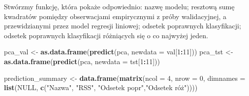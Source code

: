 \documentclass[
]{article}
\newenvironment{Shaded}{\begin{snugshade}}{\end{snugshade}}
\newcommand{\AttributeTok}[1]{\textcolor[rgb]{0.13,0.29,0.53}{#1}}
\newcommand{\ConstantTok}[1]{\textcolor[rgb]{0.56,0.35,0.01}{#1}}
\newcommand{\DecValTok}[1]{\textcolor[rgb]{0.00,0.00,0.81}{#1}}
\newcommand{\FunctionTok}[1]{\textcolor[rgb]{0.13,0.29,0.53}{\textbf{#1}}}
\newcommand{\NormalTok}[1]{#1}
\newcommand{\OtherTok}[1]{\textcolor[rgb]{0.56,0.35,0.01}{#1}}
\newcommand{\SpecialCharTok}[1]{\textcolor[rgb]{0.81,0.36,0.00}{\textbf{#1}}}
\newcommand{\StringTok}[1]{\textcolor[rgb]{0.31,0.60,0.02}{#1}}
\begin{document}
Stwórzmy funkcję, która pokaże odpowiednio: nazwę modelu; resztową sumę
kwadratów pomiędzy obserwacjami empirycznymi z próby walidacyjnej, a
przewidzianymi przez model regresji liniowej; odsetek poprawnych
klasyfikacji; odsetek poprawnych klasyfikacji różniących się o co
najwyżej jeden.

\begin{Shaded}
\begin{Highlighting}[]
\NormalTok{pca\_val }\OtherTok{\textless{}{-}} \FunctionTok{as.data.frame}\NormalTok{(}\FunctionTok{predict}\NormalTok{(pca, }\AttributeTok{newdata =}\NormalTok{ val[}\DecValTok{1}\SpecialCharTok{:}\DecValTok{11}\NormalTok{]))}
\NormalTok{pca\_tst }\OtherTok{\textless{}{-}} \FunctionTok{as.data.frame}\NormalTok{(}\FunctionTok{predict}\NormalTok{(pca, }\AttributeTok{newdata =}\NormalTok{ tst[}\DecValTok{1}\SpecialCharTok{:}\DecValTok{11}\NormalTok{]))}
\end{Highlighting}
\end{Shaded}

\begin{Shaded}
\begin{Highlighting}[]
\NormalTok{prediction\_summary }\OtherTok{\textless{}{-}} \FunctionTok{data.frame}\NormalTok{(}\FunctionTok{matrix}\NormalTok{(}\AttributeTok{ncol =} \DecValTok{4}\NormalTok{, }\AttributeTok{nrow =} \DecValTok{0}\NormalTok{, }\AttributeTok{dimnames =} \FunctionTok{list}\NormalTok{(}\ConstantTok{NULL}\NormalTok{, }\FunctionTok{c}\NormalTok{(}\StringTok{"Nazwa"}\NormalTok{, }\StringTok{"RSS"}\NormalTok{, }\StringTok{"Odsetek popr"}\NormalTok{,}\StringTok{"Odsetek róż"}\NormalTok{))))}
\end{Highlighting}
\end{Shaded}
\end{document}

